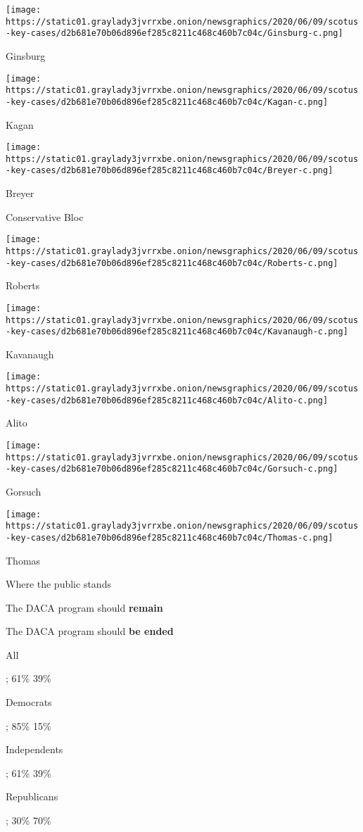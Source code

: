 \texttt{[image: https://static01.graylady3jvrrxbe.onion/newsgraphics/2020/06/09/scotus-key-cases/d2b681e70b06d896ef285c8211c468c460b7c04c/Ginsburg-c.png]}

Ginsburg

\texttt{[image: https://static01.graylady3jvrrxbe.onion/newsgraphics/2020/06/09/scotus-key-cases/d2b681e70b06d896ef285c8211c468c460b7c04c/Kagan-c.png]}

Kagan

\texttt{[image: https://static01.graylady3jvrrxbe.onion/newsgraphics/2020/06/09/scotus-key-cases/d2b681e70b06d896ef285c8211c468c460b7c04c/Breyer-c.png]}

Breyer

Conservative Bloc

\texttt{[image: https://static01.graylady3jvrrxbe.onion/newsgraphics/2020/06/09/scotus-key-cases/d2b681e70b06d896ef285c8211c468c460b7c04c/Roberts-c.png]}

Roberts

\texttt{[image: https://static01.graylady3jvrrxbe.onion/newsgraphics/2020/06/09/scotus-key-cases/d2b681e70b06d896ef285c8211c468c460b7c04c/Kavanaugh-c.png]}

Kavanaugh

\texttt{[image: https://static01.graylady3jvrrxbe.onion/newsgraphics/2020/06/09/scotus-key-cases/d2b681e70b06d896ef285c8211c468c460b7c04c/Alito-c.png]}

Alito

\texttt{[image: https://static01.graylady3jvrrxbe.onion/newsgraphics/2020/06/09/scotus-key-cases/d2b681e70b06d896ef285c8211c468c460b7c04c/Gorsuch-c.png]}

Gorsuch

\texttt{[image: https://static01.graylady3jvrrxbe.onion/newsgraphics/2020/06/09/scotus-key-cases/d2b681e70b06d896ef285c8211c468c460b7c04c/Thomas-c.png]}

Thomas

Where the public stands

The DACA program should \textbf{remain}

The DACA program should \textbf{be ended}

All

; 61\% 39\%

Democrats

; 85\% 15\%

Independents

; 61\% 39\%

Republicans

; 30\% 70\%

